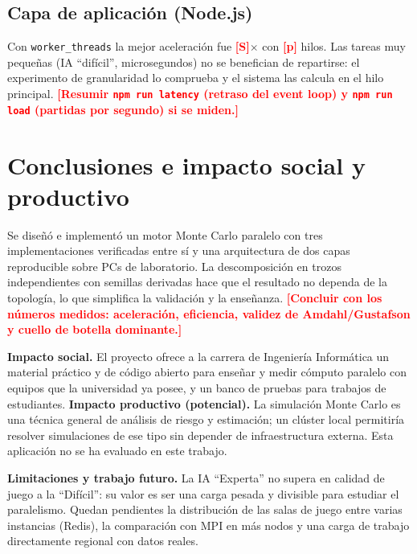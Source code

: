 \documentclass[conference]{IEEEtran}
\newcommand{\TODO}[1]{\textcolor{red}{\textbf{[#1]}}}
\newcommand{\NodeSpeedupMax}{\TODO{S}}\newcommand{\NodeProcMax}{\TODO{p}}
\begin{document}
\subsection{Capa de aplicaci\'on (Node.js)}
Con \texttt{worker\_threads} la mejor aceleraci\'on fue \NodeSpeedupMax{}$\times$ con \NodeProcMax{} hilos. Las tareas muy peque\~nas (IA ``dif\'icil'', microsegundos) no se benefician de repartirse: el experimento de granularidad lo comprueba y el sistema las calcula en el hilo principal. \TODO{Resumir \texttt{npm run latency} (retraso del event loop) y \texttt{npm run load} (partidas por segundo) si se miden.}

\section{Conclusiones e impacto social y productivo}
Se dise\~n\'o e implement\'o un motor Monte Carlo paralelo con tres implementaciones verificadas entre s\'i y una arquitectura de dos capas reproducible sobre PCs de laboratorio. La descomposici\'on en trozos independientes con semillas derivadas hace que el resultado no dependa de la topolog\'ia, lo que simplifica la validaci\'on y la ense\~nanza. \TODO{Concluir con los n\'umeros medidos: aceleraci\'on, eficiencia, validez de Amdahl/Gustafson y cuello de botella dominante.}

\textbf{Impacto social.} El proyecto ofrece a la carrera de Ingenier\'ia Inform\'atica un material pr\'actico y de c\'odigo abierto para ense\~nar y medir c\'omputo paralelo con equipos que la universidad ya posee, y un banco de pruebas para trabajos de estudiantes. \textbf{Impacto productivo (potencial).} La simulaci\'on Monte Carlo es una t\'ecnica general de an\'alisis de riesgo y estimaci\'on; un cl\'uster local permitir\'ia resolver simulaciones de ese tipo sin depender de infraestructura externa. Esta aplicaci\'on no se ha evaluado en este trabajo.

\textbf{Limitaciones y trabajo futuro.} La IA ``Experta'' no supera en calidad de juego a la ``Dif\'icil'': su valor es ser una carga pesada y divisible para estudiar el paralelismo. Quedan pendientes la distribuci\'on de las salas de juego entre varias instancias (Redis), la comparaci\'on con MPI en m\'as nodos y una carga de trabajo directamente regional con datos reales.



\end{document}
